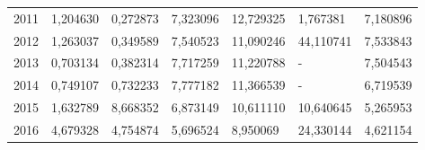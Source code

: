 \begin{table}
\begin{tabular}{p{1cm}p{2cm}p{2cm}p{2cm}p{2cm}p{2cm}p{2cm}}
 2011 &                               1,204630 &      0,272873 &            7,323096 &                       12,729325 &                        1,767381 &   7,180896 \\
 2012 &                               1,263037 &      0,349589 &            7,540523 &                       11,090246 &                       44,110741 &   7,533843 \\
 2013 &                               0,703134 &      0,382314 &            7,717259 &                       11,220788 &                               - &   7,504543 \\
 2014 &                               0,749107 &      0,732233 &            7,777182 &                       11,366539 &                               - &   6,719539 \\
 2015 &                               1,632789 &      8,668352 &            6,873149 &                       10,611110 &                       10,640645 &   5,265953 \\
 2016 &                               4,679328 &      4,754874 &            5,696524 &                        8,950069 &                       24,330144 &   4,621154 \\
\bottomrule
\end{tabular}
\end{table}
